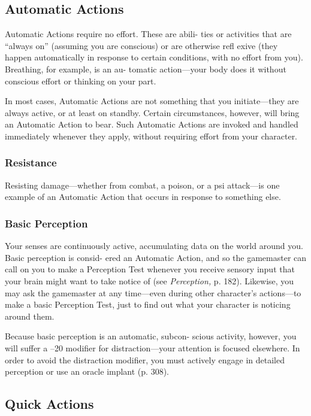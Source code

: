 \subsection{Automatic Actions}

Automatic Actions require no effort. These are abili-
ties or activities that are ``always on'' (assuming you 
are conscious) or are otherwise refl exive (they happen 
automatically in response to certain conditions, with 
no effort from you). Breathing, for example, is an au-
tomatic action—your body does it without conscious 
effort or thinking on your part.

In most cases, Automatic Actions are not something 
that you initiate—they are always active, or at least 
on standby. Certain circumstances, however, will bring 
an Automatic Action to bear. Such Automatic Actions 
are invoked and handled immediately whenever they 
apply, without requiring effort from your character.

\subsubsection{Resistance}

Resisting damage—whether from combat, a poison, or 
a psi attack—is one example of an Automatic Action 
that occurs in response to something else.

\subsubsection{Basic Perception}

Your senses are continuously active, accumulating data 
on the world around you. Basic perception is consid-
ered an Automatic Action, and so the gamemaster can 
call on you to make a Perception Test whenever you 
receive sensory input that your brain might want to 
take notice of (see \textit{Perception,} p. 182). Likewise, you 
may ask the gamemaster at any time—even during 
other character's actions—to make a basic Perception 
Test, just to find out what your character is noticing 
around them.

Because basic perception is an automatic, subcon-
scious activity, however, you will suffer a –20 modifier 
for distraction—your attention is focused elsewhere. 
In order to avoid the distraction modifier, you must 
actively engage in detailed perception or use an oracle 
implant (p. 308).

\subsection{Quick Actions}


